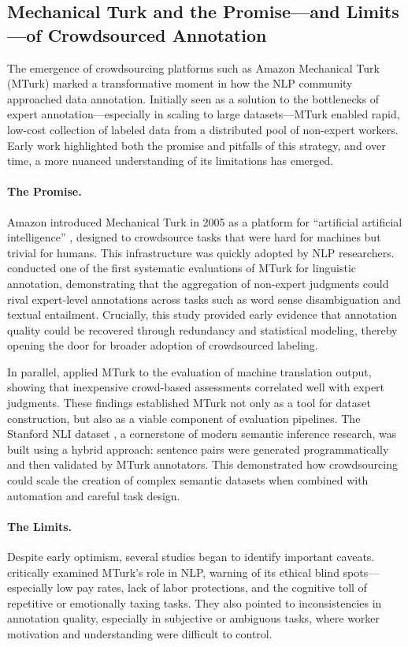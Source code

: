 \subsection{Mechanical Turk and the Promise—and Limits—of Crowdsourced Annotation}

The emergence of crowdsourcing platforms such as Amazon Mechanical Turk (MTurk) marked a transformative moment in how the NLP community approached data annotation. Initially seen as a solution to the bottlenecks of expert annotation—especially in scaling to large datasets—MTurk enabled rapid, low-cost collection of labeled data from a distributed pool of non-expert workers. Early work highlighted both the promise and pitfalls of this strategy, and over time, a more nuanced understanding of its limitations has emerged.

\paragraph{The Promise.} Amazon introduced Mechanical Turk in 2005 as a platform for ``artificial artificial intelligence'' \citep{borthwick2005mechanical}, designed to crowdsource tasks that were hard for machines but trivial for humans. This infrastructure was quickly adopted by NLP researchers. \citet{snow2008cheap} conducted one of the first systematic evaluations of MTurk for linguistic annotation, demonstrating that the aggregation of non-expert judgments could rival expert-level annotations across tasks such as word sense disambiguation and textual entailment. Crucially, this study provided early evidence that annotation quality could be recovered through redundancy and statistical modeling, thereby opening the door for broader adoption of crowdsourced labeling.

In parallel, \citet{callison2009fast} applied MTurk to the evaluation of machine translation output, showing that inexpensive crowd-based assessments correlated well with expert judgments. These findings established MTurk not only as a tool for dataset construction, but also as a viable component of evaluation pipelines. The Stanford NLI dataset \citep{bowman2015large}, a cornerstone of modern semantic inference research, was built using a hybrid approach: sentence pairs were generated programmatically and then validated by MTurk annotators. This demonstrated how crowdsourcing could scale the creation of complex semantic datasets when combined with automation and careful task design.

\paragraph{The Limits.} Despite early optimism, several studies began to identify important caveats. \citet{fort2011amazon} critically examined MTurk's role in NLP, warning of its ethical blind spots—especially low pay rates, lack of labor protections, and the cognitive toll of repetitive or emotionally taxing tasks. They also pointed to inconsistencies in annotation quality, especially in subjective or ambiguous tasks, where worker motivation and understanding were difficult to control.

